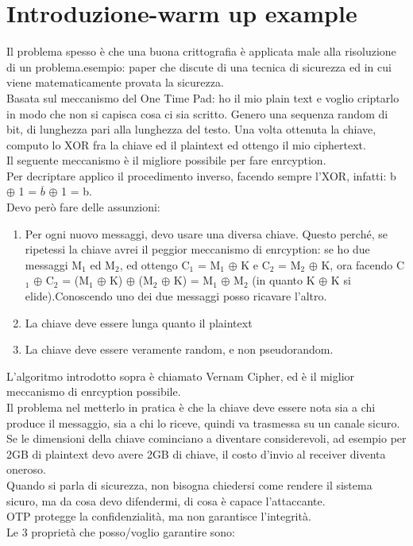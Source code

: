 \documentclass[16px]{article}
\begin{document}
\tableofcontents
\large
\section{Introduzione-warm up example}
Il problema spesso è che una buona crittografia è applicata male alla risoluzione di un problema.esempio: paper che discute di una tecnica di sicurezza ed in cui viene matematicamente provata la sicurezza.\\ Basata sul meccanismo del One Time Pad: ho il mio plain text e voglio criptarlo in modo che non si capisca cosa ci sia scritto. Genero una sequenza random di bit, di lunghezza pari alla lunghezza del testo. Una volta ottenuta la chiave, computo lo XOR fra la chiave ed il plaintext ed ottengo il mio ciphertext.\\ Il seguente meccanismo è il migliore possibile per fare enrcyption.\\ Per decriptare applico il procedimento inverso, facendo sempre l'XOR, infatti: b $\oplus$ 1 = $\overline{b}$ $\oplus$ 1 = b.\\ Devo però fare delle assunzioni:
\begin{enumerate}
\item Per ogni nuovo messaggi, devo usare una diversa chiave. Questo perché, se ripetessi la chiave avrei il peggior meccanismo di enrcyption: se ho due messaggi M$_{1}$ ed M$_{2}$, ed ottengo C$_{1}$ = M$_{1}$ $\oplus$ K e C$_{2}$ = M$_{2}$ $\oplus$ K, ora facendo C$_{1}$ $\oplus$ C$_{2}$ = (M$_{1}$ $\oplus$ K) $\oplus$ (M$_{2}$ $\oplus$ K) = M$_{1}$ $\oplus$ M$_{2}$ (in quanto K $\oplus$ K si elide).Conoscendo uno dei due messaggi posso ricavare l'altro.
\item La chiave deve essere lunga quanto il plaintext
\item La chiave deve essere veramente random, e non pseudorandom.
\end{enumerate}
L'algoritmo introdotto sopra è chiamato Vernam Cipher, ed è il miglior meccanismo di enrcyption possibile.\\ Il problema nel metterlo in pratica è che la chiave deve essere nota sia a chi produce il messaggio, sia a chi lo riceve, quindi va trasmessa su un canale sicuro. Se le dimensioni della chiave cominciano a diventare considerevoli, ad esempio per 2GB di plaintext devo avere 2GB di chiave, il costo d'invio al receiver diventa oneroso.\\ Quando si parla di sicurezza, non bisogna chiedersi come rendere il sistema sicuro, ma da cosa devo difendermi, di cosa è capace l'attaccante.\\ OTP protegge la confidenzialità, ma non garantisce l'integrità.\\ Le 3 proprietà che posso/voglio garantire sono:
\end{document}
